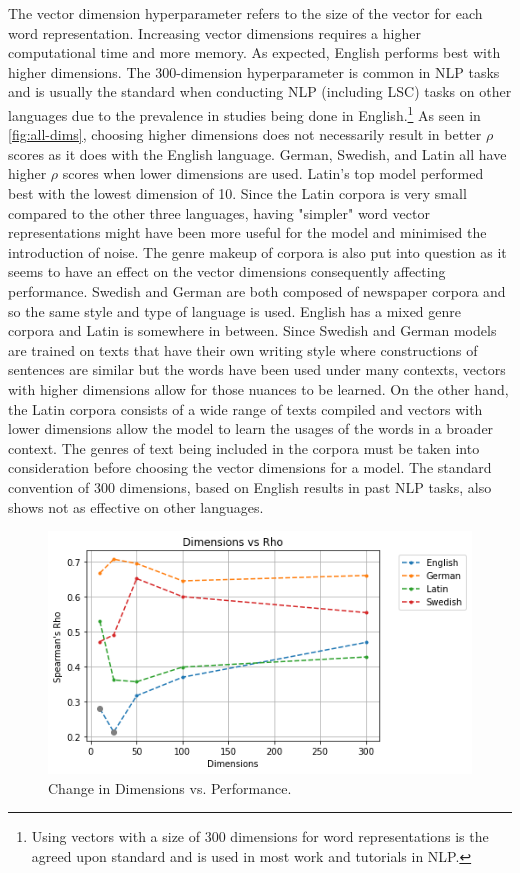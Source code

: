 The vector dimension hyperparameter refers to the size of the vector for each word representation. Increasing vector dimensions requires a higher computational time and more memory. As expected, English performs best with higher dimensions. The 300-dimension hyperparameter is common in NLP tasks and is usually the standard when conducting NLP (including LSC) tasks on other languages due to the prevalence in studies being done in English.\footnote{Using vectors with a size of 300 dimensions for word representations is the agreed upon standard and is used in most work and tutorials in NLP.} As seen in \autoref{fig:all-dims}, choosing higher dimensions does not necessarily result in better $\rho$ scores as it does with the English language. German, Swedish, and Latin all have higher $\rho$ scores when lower dimensions are used. Latin’s top model performed best with the lowest dimension of 10. Since the Latin corpora is very small compared to the other three languages, having "simpler" word vector representations might have been more useful for the model and minimised the introduction of noise. The genre makeup of corpora is also put into question as it seems to have an effect on the vector dimensions consequently affecting performance. Swedish and German are both composed of newspaper corpora and so the same style and type of language is used. English has a mixed genre corpora and Latin is somewhere in between. Since Swedish and German models are trained on texts that have their own writing style where constructions of sentences are similar but the words have been used under many contexts, vectors with higher dimensions allow for those nuances to be learned. On the other hand, the Latin corpora consists of a wide range of texts compiled and vectors with lower dimensions allow the model to learn the usages of the words in a broader context. The genres of text being included in the corpora must be taken into consideration before choosing the vector dimensions for a model. The standard convention of 300 dimensions, based on English results in past NLP tasks, also shows not as effective on other languages.


\begin{figure}[h]
  \centering
  \includegraphics[width=.8\linewidth]{sections/figures/dims_all.png}
  \caption{Change in Dimensions vs. Performance.}
  \label{fig:all-dims}
\end{figure}


